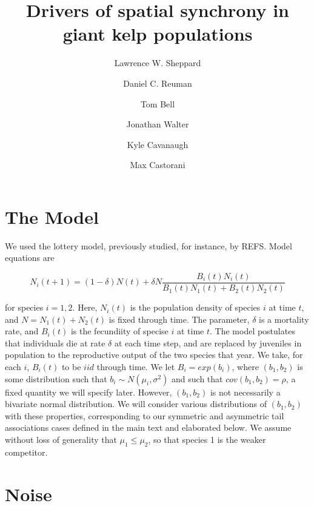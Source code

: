 \documentclass[letterpaper,11pt]{article}
\title{Drivers of spatial synchrony in giant kelp populations}
\date{}
\author{Lawrence W. Sheppard}
\author{Daniel C. Reuman}
\author{Tom Bell}
\author{Jonathan Walter}
\author{Kyle Cavanaugh}
\author{Max Castorani}
\begin{document}



\maketitle


\section{The Model}

We used the lottery model, previously studied, for instance, by REFS. Model equations are

\begin{equation}
N_i(t+1)=(1-\delta)N(t)+\delta N \frac{B_i(t)N_i(t)}{B_1(t)N_1(t)+B_2(t)N_2(t)}  \label{model_eq}
\end{equation}

\noindent for species $i=1,2$. Here, $N_i(t)$ is the population density of species $i$ at time $t$, and $N = N_1(t)+N_2(t)$ is fixed through time. The parameter, $\delta$ is a mortality rate, and $B_i(t)$ is the fecundiity of specise $i$ at time $t$. The model postulates that individuals die at rate $\delta$ at each time step, and are replaced by juveniles in population to the reproductive output of the two species that year. We take, for each $i$, $B_i(t)$ to be $iid$ through time. We let $B_i = exp(b_i)$, where $(b_1, b_2)$ is some distribution such that $b_i \sim N(\mu_i, \sigma^2)$ and such that $cov(b_1, b_2) = \rho$, a fixed quantity we will specify later. However, $(b_1, b_2)$ is not necessarily a bivariate normal distribution. We will consider various distributions of $(b_1, b_2)$ with these properties, corresponding to our symmetric and asymmetric tail associations cases defined in the main text and elaborated below. We assume without loss of generality that $\mu_1 \leq \mu_2$, so that species 1 is the weaker competitor. 

\section{Noise} \label{sect:noise}
\end{document}
